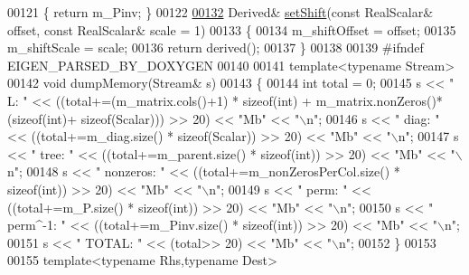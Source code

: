 \begin{DoxyCode}
00121 \textcolor{keyword}{    }\{ \textcolor{keywordflow}{return} m\_Pinv; \}
00122 
\hyperlink{group___sparse_cholesky___module_a362352f755101faaac59c1ed9d5e3559}{00132}     Derived& \hyperlink{group___sparse_cholesky___module_a362352f755101faaac59c1ed9d5e3559}{setShift}(\textcolor{keyword}{const} RealScalar& offset, \textcolor{keyword}{const} RealScalar& scale = 1)
00133     \{
00134       m\_shiftOffset = offset;
00135       m\_shiftScale = scale;
00136       \textcolor{keywordflow}{return} derived();
00137     \}
00138 
00139 \textcolor{preprocessor}{#ifndef EIGEN\_PARSED\_BY\_DOXYGEN}
00140 
00141     \textcolor{keyword}{template}<\textcolor{keyword}{typename} Stream>
00142     \textcolor{keywordtype}{void} dumpMemory(Stream& s)
00143     \{
00144       \textcolor{keywordtype}{int} total = 0;
00145       s << \textcolor{stringliteral}{"  L:        "} << ((total+=(m\_matrix.cols()+1) * \textcolor{keyword}{sizeof}(\textcolor{keywordtype}{int}) + m\_matrix.nonZeros()*(\textcolor{keyword}{sizeof}(int)+\textcolor{keyword}{
      sizeof}(Scalar))) >> 20) << \textcolor{stringliteral}{"Mb"} << \textcolor{stringliteral}{"\(\backslash\)n"};
00146       s << \textcolor{stringliteral}{"  diag:     "} << ((total+=m\_diag.size() * \textcolor{keyword}{sizeof}(Scalar)) >> 20) << \textcolor{stringliteral}{"Mb"} << \textcolor{stringliteral}{"\(\backslash\)n"};
00147       s << \textcolor{stringliteral}{"  tree:     "} << ((total+=m\_parent.size() * \textcolor{keyword}{sizeof}(int)) >> 20) << \textcolor{stringliteral}{"Mb"} << \textcolor{stringliteral}{"\(\backslash\)n"};
00148       s << \textcolor{stringliteral}{"  nonzeros: "} << ((total+=m\_nonZerosPerCol.size() * \textcolor{keyword}{sizeof}(int)) >> 20) << \textcolor{stringliteral}{"Mb"} << \textcolor{stringliteral}{"\(\backslash\)n"};
00149       s << \textcolor{stringliteral}{"  perm:     "} << ((total+=m\_P.size() * \textcolor{keyword}{sizeof}(int)) >> 20) << \textcolor{stringliteral}{"Mb"} << \textcolor{stringliteral}{"\(\backslash\)n"};
00150       s << \textcolor{stringliteral}{"  perm^-1:  "} << ((total+=m\_Pinv.size() * \textcolor{keyword}{sizeof}(int)) >> 20) << \textcolor{stringliteral}{"Mb"} << \textcolor{stringliteral}{"\(\backslash\)n"};
00151       s << \textcolor{stringliteral}{"  TOTAL:    "} << (total>> 20) << \textcolor{stringliteral}{"Mb"} << \textcolor{stringliteral}{"\(\backslash\)n"};
00152     \}
00153 
00155     \textcolor{keyword}{template}<\textcolor{keyword}{typename} Rhs,\textcolor{keyword}{typename} Dest>

\end{DoxyCode}
